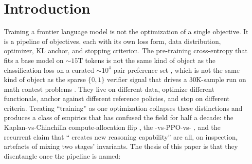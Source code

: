 
\section{Introduction}
\label{sec:introduction}

Training a frontier language model is not the optimization of a single
objective. It is a pipeline of objectives, each with its own loss form,
data distribution, optimizer, KL anchor, and stopping criterion. The
pre-training cross-entropy that fits a base model on $\sim\!15$T tokens
\citep[\S 3.2]{deepseek-v3} is not the same kind of object as the
classification loss on a curated $\sim\!10^4$-pair preference set
\citep{rafailov2023-dpo}, which is not the same kind of object as the
sparse $\{0,1\}$ verifier signal that drives a $30$K-sample  run on
math contest problems
\citep{shao2024,deepseek-r1}. They live on different data, optimize
different functionals, anchor against different reference policies, and
stop on different criteria. Treating ``training'' as one optimization
collapses these distinctions and produces a class of empirics that has
confused the field for half a decade: the
Kaplan-vs-Chinchilla compute-allocation flip
\citep{kaplan2020,hoffmann2022-chinchilla}, the
-vs-PPO-vs- , and the recurrent claim that `` creates
new reasoning capability'' are all, on inspection, artefacts of mixing
two stages' invariants. The thesis of this paper is that they
disentangle once the pipeline is named:
